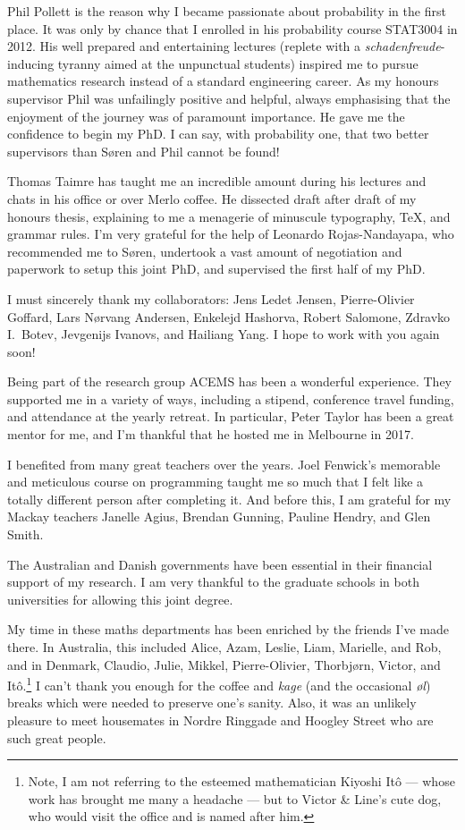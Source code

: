 Phil Pollett is the reason why I became passionate about probability in the first place. It was only by chance that I enrolled in his probability course STAT3004 in 2012. His well prepared and entertaining lectures (replete with a \emph{schadenfreude}-inducing tyranny aimed at the unpunctual students) inspired me to pursue mathematics research instead of a standard engineering career. As my honours supervisor Phil was unfailingly positive and helpful, always emphasising that the enjoyment of the journey was of paramount importance. He gave me the confidence to begin my PhD. I can say, with probability one, that two better supervisors than S{\o}ren and Phil cannot be found!

Thomas Taimre has taught me an incredible amount during his lectures and chats in his office or over Merlo coffee. He dissected draft after draft of my honours thesis, explaining to me a menagerie of minuscule typography, \TeX, and grammar rules. I'm very grateful for the help of Leonardo Rojas-Nandayapa, who recommended me to S{\o}ren, undertook a vast amount of negotiation and paperwork to setup this joint PhD, and supervised the first half of my PhD.

I must sincerely thank my collaborators: Jens Ledet Jensen, Pierre-Olivier Goffard, Lars N{\o}rvang Andersen, Enkelejd Hashorva, Robert Salomone, Zdravko I.\ Botev, Jevgenijs Ivanovs, and Hailiang Yang. I hope to work with you again soon!

Being part of the research group ACEMS has been a wonderful experience. They supported me in a variety of ways, including a stipend, conference travel funding, and attendance at the yearly retreat. In particular, Peter Taylor has been a great mentor for me, and I'm thankful that he hosted me in Melbourne in 2017.

I benefited from many great teachers over the years. Joel Fenwick's memorable and meticulous course on programming taught me so much that I felt like a totally different person after completing it. And before this, I am grateful for my Mackay teachers Janelle Agius, Brendan Gunning, Pauline Hendry, and Glen Smith.

The Australian and Danish governments have been essential in their financial support of my research. I am very thankful to the graduate schools in both universities for allowing this joint degree.

My time in these maths departments has been enriched by the friends I've made there. In Australia, this included Alice, Azam, Leslie, Liam, Marielle, and Rob, and in Denmark, Claudio, Julie, Mikkel, Pierre-Olivier, Thorbj{\o}rn, Victor, and It{\^o}.\footnote{Note, I am not referring to the esteemed mathematician Kiyoshi It{\^o} --- whose work has brought me many a headache --- but to Victor \& Line's cute dog, who would visit the office and is named after him.} I can't thank you enough for the coffee and \emph{kage} (and the occasional \emph{{\o}l}) breaks which were needed to preserve one's sanity. Also, it was an unlikely pleasure to meet housemates in Nordre Ringgade and Hoogley Street who are such great people.

